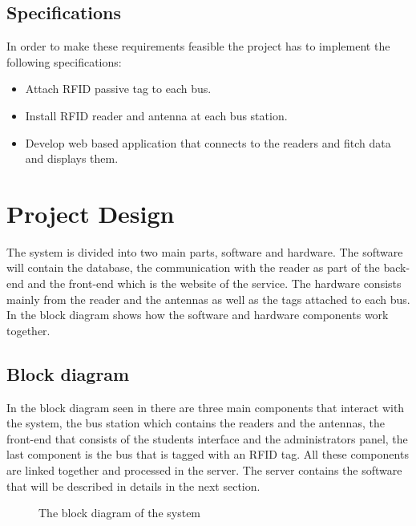 \documentclass[a4paper,twoside]{article}
\begin{document}
\subsection{Specifications}
In order to make these requirements feasible the project has to implement the following specifications:
\begin{itemize}
\item 
Attach RFID passive tag to each bus.
\item
Install RFID reader and antenna at each bus station.
\item
Develop web based application that connects to the readers and fitch data and displays them.
\end{itemize}

\section{Project Design}
The system is divided into two main parts, software and hardware. The software will contain the database, the communication with the reader as part of the back-end and the front-end which is the website of the service. The hardware consists mainly from the reader and the antennas as well as the tags attached to each bus. In  the block diagram shows how the software and hardware components work together.
\subsection{Block diagram}
In the block diagram seen in  there are three main components that interact with the system, the bus station which contains the readers and the antennas, the front-end that consists of the students interface and the administrators panel, the last component is the bus that is tagged with an RFID tag. All these components are linked together and processed in the server. The server contains the software that will be described in details in the next section.
\begin{figure}
\centering
{}
\caption{The block diagram of the system}
\label{blockdiagram}
\end{figure}
\end{document}
